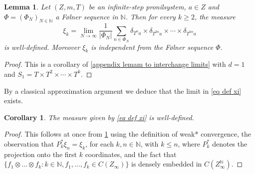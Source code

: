 \documentclass[letter, 11pt]{article}
\newtheorem{cor}[theo]{Corollary}
\newtheorem{lemma}[theo]{Lemma}
\theoremstyle{definition}
\theoremstyle{plain}
\newcommand{\N}{\mathbb{N}}
\newcommand{\1}{\mathbbm{1}}
\begin{document}
\begin{lemma} \label{xi_k is well-defined}
    Let $(Z, m,T)$ be an infinite-step pronilsystem, $a \in Z$ and $\Phi=(\Phi_N)_{N\in \N}$ a F\o lner sequence in $\N$. Then for every $k \geq 2$, the measure 
    \begin{equation*}
        \xi_k =  \lim_{N \to \infty} \frac{1}{|\Phi_N|} \sum_{n \in \Phi_N} \delta_{T^n a} \times \delta_{T^{2n}a} \times \cdots \times  \delta_{T^{kn}a}
    \end{equation*}
    is well-defined. Moreover $\xi_k$ is independent from the F\o lner sequence $\Phi$. 
\end{lemma}

\begin{proof}
This is a corollary of \cref{appendix lemam to interchange limits} with $d=1$ and $S_1=T\times T^2 \times \cdots \times T^k$.

\end{proof}

By a classical approximation argument we deduce that the limit in \eqref{eq def xi} exists.

\begin{cor}
    The measure given by \eqref{eq def xi} is well-defined. 
\end{cor}
\begin{proof}
This follows at once from \cref{xi_k is well-defined} using the definition of weak* convergence, the observation that $P_k^*\xi_{n}=\xi_k$, for each $k,n\in \N$, with $k\leq n$, where $P_k^*$ denotes the projection onto the first $k$ coordinates, and the fact that $\{f_1 \otimes \dots \otimes f_k : k\in \N, f_1,\ldots,f_k \in C(Z_{\infty})\}$ is densely embedded in $C(Z_{\infty}^{\N})$. 
\end{proof}
\end{document}
